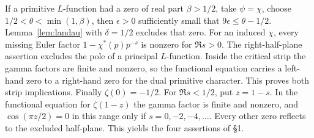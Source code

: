 \documentclass[letterpaper,11pt]{article}
\begin{document}
If a primitive \(L\)-function had a zero of real part \(\beta>1/2\), take \(\psi=\chi\), choose \(1/2<\theta<\min(1,\beta)\), then \(\epsilon>0\) sufficiently small that \(9\epsilon\le\theta-1/2\). Lemma~\ref{lem:landau} with \(\delta=1/2\) excludes that zero. For an induced \(\chi\), every missing Euler factor \(1-\chi^*(p)p^{-s}\) is nonzero for \(\Re s>0\). The right-half-plane assertion excludes the pole of a principal \(L\)-function. Inside the critical strip the gamma factors are finite and nonzero, so the functional equation carries a left-hand zero to a right-hand zero for the dual primitive character. This proves both strip implications. Finally \(\zeta(0)=-1/2\). For \(\Re s<1/2\), put \(z=1-s\). In the functional equation for \(\zeta(1-z)\) the gamma factor is finite and nonzero, and \(\cos(\pi z/2)=0\) in this range only if \(s=0,-2,-4,\ldots\). Every other zero reflects to the excluded half-plane. This yields the four assertions of \S1.
\appendix
\end{document}
